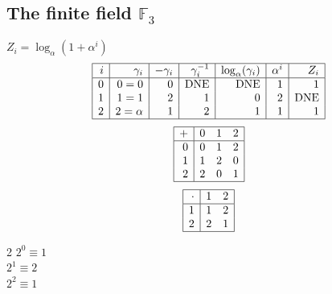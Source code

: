 \documentclass{article}
\begin{document}
{\subsection{The finite field ${\mathbb F}_{3}$}
\small
$Z_i = \log_\alpha (1 + \alpha^i)$\\
$$\begin{array}{|*{7}{r|}}
\hline
i & \gamma_i & -\gamma_i& \gamma_i^{-1}& \log_\alpha(\gamma_i)& \alpha^i& Z_i\\
\hline
  0 & 0 = 0 &0 & \mbox{DNE} & \mbox{DNE} &1 &1\\
  1 &   1 = 1 &2 &1 &0 &2 & \mbox{DNE}\\
  2 &   2 = \alpha  &1 &2 &1 &1 &1\\
\hline
\end{array}
$$
$$
\begin{array}{|r|*{3}{r}|}
\hline
+  &         0 &         1 &         2\\
\hline
         0&         0&         1&         2\\
         1&         1&         2&         0\\
         2&         2&         0&         1\\
\hline
\end{array}
$$
$$
\begin{array}{|r|*{2}{r}|}
\hline
\cdot  &         1 &         2\\
\hline
         1&         1&         2\\
         2&         2&         1\\
\hline
\end{array}
$$
\begin{multicols}{2}
\noindent
$2^{0} \equiv 1$\\
$2^{1} \equiv 2$\\
$2^{2} \equiv 1$\\
\end{multicols}

\bigskip

}
\end{document}
